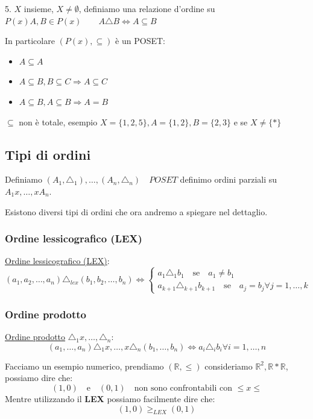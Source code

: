 \documentclass{article}
\theoremstyle{definition}
\begin{document}
5. $ X $ insieme, $ X \not = \emptyset $, definiamo una relazione d'ordine su $ P(x)  A,B \in P(x) \quad \quad A \triangle B \Leftrightarrow A \subseteq B $ \par
In particolare $ (P(x), \subseteq )$ è un POSET:\newline
\begin{itemize}
        \item $ A \subseteq A $
        \item $ A \subseteq B, B \subseteq C \Rightarrow A \subseteq C $
        \item $ A \subseteq B, A \subseteq B \Rightarrow A = B $
\end{itemize}
$ \subseteq $ non è totale, esempio $ X = \{1,2,5\}, A = \{1,2\}, B = \{2,3\} $ e se $ X \not = \{*\} $



\subsection{Tipi di ordini}
Definiamo $(A_1, \triangle_1), \ldots, (A_n, \triangle_n) \quad POSET$ definimo ordini parziali su $A_1x, \ldots, xA_n$. \par
Esistono diversi tipi di ordini che ora andremo a spiegare nel dettaglio.


\subsubsection{Ordine lessicografico (LEX)}
\underline{Ordine lessicografico (LEX)}:
\[ 
(a_1,a_2,\ldots, a_n) \triangle_{lex} (b_1,b_2,\ldots, b_n) \Leftrightarrow   
\begin{cases}
        a_1 \triangle_1 b_1 \quad \mbox{se} \quad  a_1 \not = b_1 \\
        a_{k+1} \triangle_{k+1} b_{k+1} \quad \mbox{se} \quad  a_j = b_j \forall j = 1,\ldots, k
\end{cases}
\]


\subsubsection{Ordine prodotto}
\underline{Ordine prodotto} $\triangle_1x,\ldots,\triangle_n$:
\begin{equation*}
        (a_1,\ldots,a_n) \triangle_1x,\ldots, x\triangle_n(b_1,\ldots,b_n) \Leftrightarrow a_i \triangle_i b_i \forall i = 1,\ldots,n
\end{equation*}

Facciamo un esempio numerico, prendiamo $(\mathbb{R}, \le)$ consideriamo $\mathbb{R}^2, \mathbb{R}*\mathbb{R}$, possiamo dire che:
\begin{equation*}
        (1, 0) \quad \mbox{e} \quad (0,1) \quad \mbox{non sono confrontabili con $\le x \le$}
\end{equation*}
Mentre utilizzando il \textbf{LEX} possiamo facilmente dire che:
\begin{equation*}
        (1, 0) \ge_{LEX} (0,1)
\end{equation*}
\end{document}

